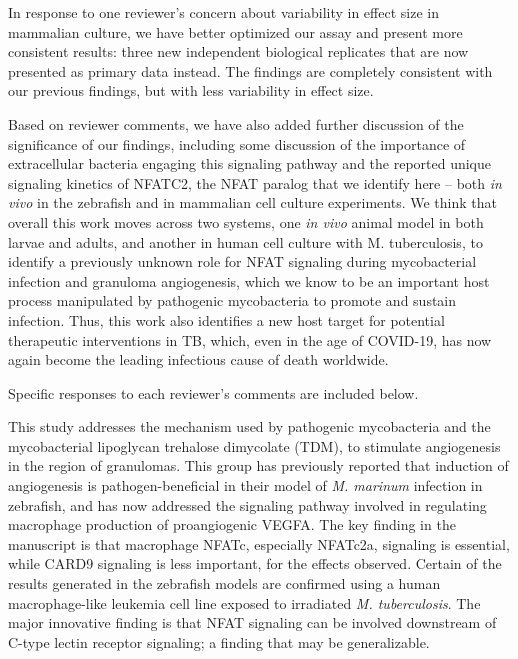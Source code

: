 \begin{description}[style=multiline, labelwidth=\widthof{Reviewer \#2:   }, font=\normalfont, leftmargin=\labelwidth, align=right]
\item \quad In response to one reviewer’s concern about variability in effect size in mammalian culture, we have better optimized our assay and present more consistent results: three new independent biological replicates that are now presented as primary data instead. The findings are completely consistent with our previous findings, but with less variability in effect size. 

\item \quad Based on reviewer comments, we have also added further discussion of the significance of our findings, including some discussion of the importance of extracellular bacteria engaging this signaling pathway and the reported unique signaling kinetics of NFATC2, the NFAT paralog that we identify here – both \textit{in vivo} in the zebrafish and in mammalian cell culture experiments. We think that overall this work moves across two systems, one \textit{in vivo} animal model in both larvae and adults, and another in human cell culture with M. tuberculosis, to identify a previously unknown role for NFAT signaling during mycobacterial infection and granuloma angiogenesis, which we know to be an important host process manipulated by pathogenic mycobacteria to promote and sustain infection. Thus, this work also identifies a new host target for potential therapeutic interventions in TB, which, even in the age of COVID\hyp{}19, has now again become the leading infectious cause of death worldwide.

\item \quad Specific responses to each reviewer’s comments are included below.

\item[Reviewer \#1: ] \quad This study addresses the mechanism used by pathogenic mycobacteria and the mycobacterial lipoglycan trehalose dimycolate (TDM), to stimulate angiogenesis in the region of granulomas. This group has previously reported that induction of angiogenesis is pathogen\hyp{}beneficial in their model of \textit{M. marinum} infection in zebrafish, and has now addressed the signaling pathway involved in regulating macrophage production of proangiogenic VEGFA. The key finding in the manuscript is that macrophage NFATc, especially NFATc2a, signaling is essential, while CARD9 signaling is less important, for the effects observed. Certain of the results generated in the zebrafish models are confirmed using a human macrophage\hyp{}like leukemia cell line exposed to irradiated \textit{M. tuberculosis}. The major innovative finding is that NFAT signaling can be involved downstream of C\hyp{}type lectin receptor signaling; a finding that may be generalizable.


\end{description}
